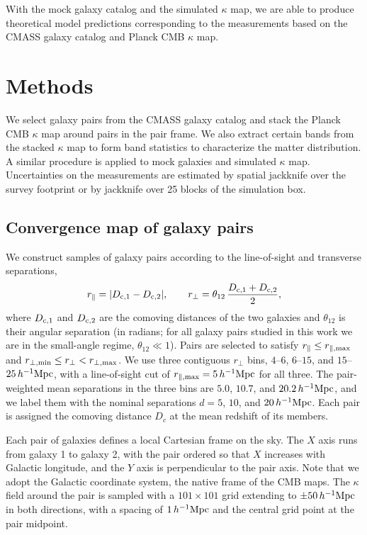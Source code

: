 \documentclass[twocolumn,anonymous,linenumbers]{aastex701}
\newcommand{\hinvMpc}{h^{-1}{\rm Mpc}}
\begin{document}
With the mock galaxy catalog and the simulated $\kappa$ map, we are able to produce theoretical model predictions corresponding to the measurements based on the CMASS galaxy catalog and Planck CMB $\kappa$ map.

\section{Methods}
\label{sec:method}

We select galaxy pairs from the CMASS galaxy catalog and stack the Planck CMB $\kappa$ map around pairs in the pair frame. We also extract certain bands from the stacked $\kappa$ map to form band statistics to characterize the matter distribution. A similar procedure is applied to mock galaxies and simulated $\kappa$ map. Uncertainties on the measurements are estimated by spatial jackknife over the survey footprint or by jackknife over 25
blocks of the simulation box.

\subsection{Convergence map of galaxy pairs}
\label{sec:pairs}

We construct samples of galaxy pairs according to the line-of-sight and transverse separations,
\begin{equation}
  r_{\parallel} = |D_{{\rm c},1}-D_{{\rm c},2}|, \qquad
  r_{\perp} = \theta_{12}\,\frac{D_{{\rm c},1}+D_{{\rm c},2}}{2},
  \label{eq:separations}
\end{equation}
where $D_{\rm c,1}$ and $D_{\rm c,2}$ are the comoving distances of the two galaxies and $\theta_{12}$ is their angular separation (in radians; for all galaxy pairs studied in this work we are in the small-angle regime, $\theta_{12}\ll1$).  Pairs are selected to satisfy $r_{\parallel}\leq r_{\parallel,{\rm max}}$ and
$r_{\perp,{\rm min}}\leq r_{\perp} < r_{\perp,{\rm max}}$.
We use three contiguous $r_\perp$ bins, $4$--$6$, $6$--$15$, and $15$--$25\,\hinvMpc$, with a line-of-sight cut of $r_{\parallel,{\rm max}}=5\,\hinvMpc$ for all three. The pair-weighted mean separations in the three bins are $5.0$, $10.7$, and $20.2\,\hinvMpc$, and we label them with the nominal separations $d=5$, $10$, and $20\,\hinvMpc$. Each pair is assigned the comoving distance $D_c$ at the mean redshift of its members. 

Each pair of galaxies defines a local Cartesian frame on the sky. The $X$ axis runs from
galaxy 1 to galaxy 2, with the pair ordered so that $X$ increases with
Galactic longitude, and the $Y$ axis is perpendicular to the pair axis. 
Note that we adopt the Galactic coordinate system, the native frame of the CMB maps. The $\kappa$ field around the pair is sampled with a $101\times101$ grid extending
to $\pm50\,\hinvMpc$ in both directions, with a spacing of
$1\,\hinvMpc$ and the central grid point at the pair midpoint.
\end{document}
